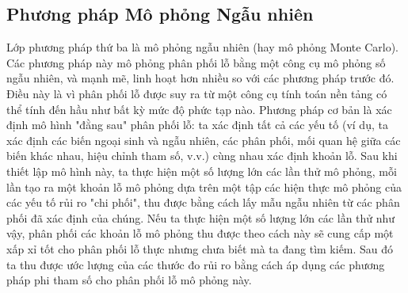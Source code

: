 \subsection{Phương pháp Mô phỏng Ngẫu nhiên}

Lớp phương pháp thứ ba là mô phỏng ngẫu nhiên (hay mô phỏng Monte Carlo). Các phương pháp này mô phỏng phân phối lỗ bằng một công cụ mô phỏng số ngẫu nhiên, và mạnh mẽ, linh hoạt hơn nhiều so với các phương pháp trước đó. Điều này là vì phân phối lỗ được suy ra từ một công cụ tính toán nền tảng có thể tính đến hầu như bất kỳ mức độ phức tạp nào. Phương pháp cơ bản là xác định mô hình "đằng sau" phân phối lỗ: ta xác định tất cả các yếu tố (ví dụ, ta xác định các biến ngoại sinh và ngẫu nhiên, các phân phối, mối quan hệ giữa các biến khác nhau, hiệu chỉnh tham số, v.v.) cùng nhau xác định khoản lỗ. Sau khi thiết lập mô hình này, ta thực hiện một số lượng lớn các lần thử mô phỏng, mỗi lần tạo ra một khoản lỗ mô phỏng dựa trên một tập các hiện thực mô phỏng của các yếu tố rủi ro "chi phối", thu được bằng cách lấy mẫu ngẫu nhiên từ các phân phối đã xác định của chúng. Nếu ta thực hiện một số lượng lớn các lần thử như vậy, phân phối các khoản lỗ mô phỏng thu được theo cách này sẽ cung cấp một xấp xỉ tốt cho phân phối lỗ thực nhưng chưa biết mà ta đang tìm kiếm. Sau đó ta thu được ước lượng của các thước đo rủi ro bằng cách áp dụng các phương pháp phi tham số cho phân phối lỗ mô phỏng này.
